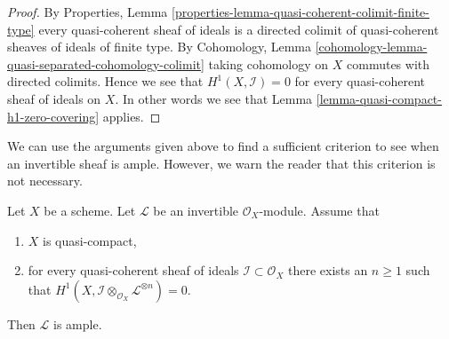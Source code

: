 \begin{proof}
By
Properties, Lemma \ref{properties-lemma-quasi-coherent-colimit-finite-type}
every quasi-coherent sheaf of ideals is a directed colimit of
quasi-coherent sheaves of ideals of finite type.
By Cohomology, Lemma \ref{cohomology-lemma-quasi-separated-cohomology-colimit}
taking cohomology on $X$ commutes with directed colimits.
Hence we see that $H^1(X, \mathcal{I}) = 0$
for every quasi-coherent sheaf of ideals on $X$. In other words
we see that Lemma \ref{lemma-quasi-compact-h1-zero-covering} applies.
\end{proof}

\noindent
We can use the arguments given above to find a sufficient criterion to
see when an invertible sheaf is ample. However, we warn the reader that
this criterion is not necessary.

\begin{lemma}
\label{lemma-quasi-compact-h1-zero-invertible}
Let $X$ be a scheme. Let $\mathcal{L}$ be an invertible $\mathcal{O}_X$-module.
Assume that
\begin{enumerate}
\item $X$ is quasi-compact,
\item for every quasi-coherent sheaf of ideals
$\mathcal{I} \subset \mathcal{O}_X$
there exists an $n \geq 1$ such that
$H^1(X, \mathcal{I} \otimes_{\mathcal{O}_X} \mathcal{L}^{\otimes n}) = 0$.
\end{enumerate}
Then $\mathcal{L}$ is ample.
\end{lemma}


